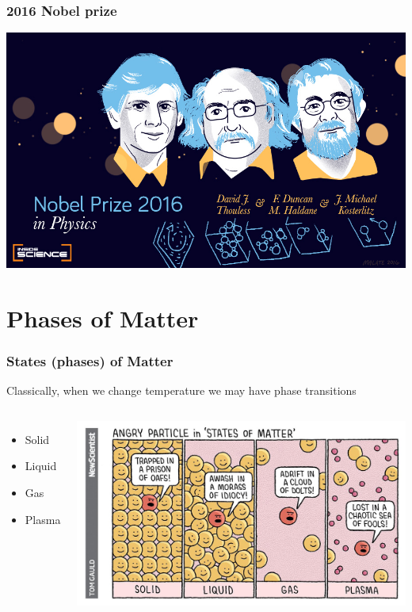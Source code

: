 
\begin{frame}
    \frametitle{2016 Nobel prize}
    \includegraphics[width=1\textwidth]{phases_of_matter/nobel_phys_2016.jpg}
\end{frame}


\section{Phases of Matter}

\begin{frame}
    \frametitle{States (phases) of Matter}

    \begin{block}{}
        Classically, when we change temperature we may have
        phase transitions
    \end{block}

    \begin{columns}
        \begin{itemize}
            \item Solid
            \item Liquid
            \item Gas
            \item Plasma
        \end{itemize}

        \includegraphics[width=1\textwidth]{phases_of_matter/tirinha_states_matter.jpg}
    \end{columns}

\end{frame}

